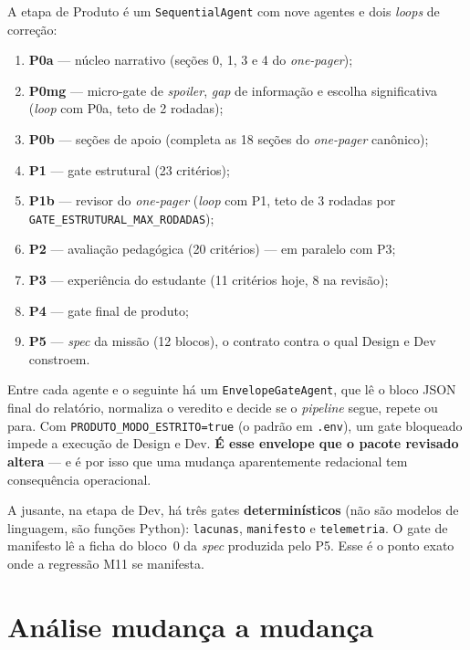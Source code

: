 \documentclass[11pt,a4paper]{article}
\newcommand{\cod}[1]{\texttt{\small #1}}
\begin{document}
A etapa de Produto é um \cod{SequentialAgent} com nove agentes e dois \textit{loops} de correção:

\begin{enumerate}[leftmargin=*,itemsep=2pt]
  \item \textbf{P0a} --- núcleo narrativo (seções 0, 1, 3 e 4 do \textit{one-pager});
  \item \textbf{P0mg} --- micro-gate de \textit{spoiler}, \textit{gap} de informação e escolha significativa
  (\textit{loop} com P0a, teto de 2 rodadas);
  \item \textbf{P0b} --- seções de apoio (completa as 18 seções do \textit{one-pager} canônico);
  \item \textbf{P1} --- gate estrutural (23 critérios);
  \item \textbf{P1b} --- revisor do \textit{one-pager} (\textit{loop} com P1, teto de 3 rodadas por
  \cod{GATE\_ESTRUTURAL\_MAX\_RODADAS});
  \item \textbf{P2} --- avaliação pedagógica (20 critérios) --- em paralelo com P3;
  \item \textbf{P3} --- experiência do estudante (11 critérios hoje, 8 na revisão);
  \item \textbf{P4} --- gate final de produto;
  \item \textbf{P5} --- \textit{spec} da missão (12 blocos), o contrato contra o qual Design e Dev constroem.
\end{enumerate}

Entre cada agente e o seguinte há um \cod{EnvelopeGateAgent}, que lê o bloco JSON final do relatório,
normaliza o veredito e decide se o \textit{pipeline} segue, repete ou para. Com
\cod{PRODUTO\_MODO\_ESTRITO=true} (o padrão em \texttt{.env}), um gate bloqueado impede a execução de Design
e Dev. \textbf{É esse envelope que o pacote revisado altera} --- e é por isso que uma mudança aparentemente
redacional tem consequência operacional.

A jusante, na etapa de Dev, há três gates \textbf{determinísticos} (não são modelos de linguagem, são
funções Python): \cod{lacunas}, \cod{manifesto} e \cod{telemetria}. O gate de manifesto lê a ficha do bloco~0
da \textit{spec} produzida pelo P5. Esse é o ponto exato onde a regressão M11 se manifesta.

\newpage
\section{Análise mudança a mudança}
\end{document}
